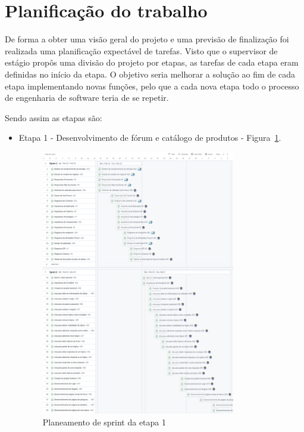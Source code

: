 \newpage

\section{Planificação do trabalho}

De forma a obter uma visão geral do projeto e uma previsão de finalização foi realizada uma planificação 
expectável de tarefas. Visto que o supervisor de estágio propôs uma divisão do projeto por etapas, as 
tarefas de cada etapa eram definidas no início da etapa. O objetivo seria melhorar a solução ao fim de 
cada etapa implementando novas funções, pelo que a cada nova etapa todo o processo de engenharia de 
software teria de se repetir.

Sendo assim as etapas são:
\begin{itemize}
    \item Etapa 1 - Desenvolvimento de fórum e catálogo de produtos - Figura~\ref{fig:1}.
    \begin{figure}[htb]
        \centering
        
        \includegraphics[width=0.8\textwidth]{images/etapa1_sprint_planning.png}
        \caption{Planeamento de sprint da etapa 1}
        \label{fig:1}
    \end{figure}
\end{itemize}



